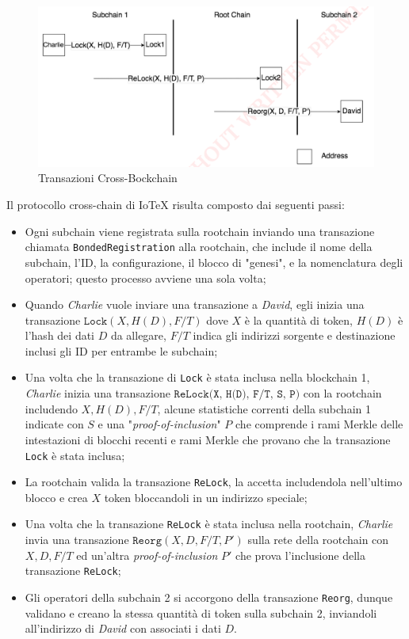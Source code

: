 \begin{figure}[ht]
	\includegraphics[width=\textwidth]{Figura2.png}
	\caption{Transazioni Cross-Bockchain}
	\label{fig:fig2}
\end{figure}

Il protocollo cross-chain di IoTeX risulta composto dai seguenti passi:

\begin{itemize}
	\item Ogni subchain viene registrata sulla rootchain inviando una transazione chiamata \texttt{BondedRegistration} alla rootchain, che include il nome della subchain, l'ID, la configurazione, il blocco di "genesi", e la nomenclatura degli operatori; questo processo avviene una sola volta;

	\item Quando \emph{Charlie} vuole inviare una transazione a \emph{David}, egli inizia una transazione $\texttt{Lock}(X, H(D), F/T)$ dove $X$ è la quantità di token, $H(D)$ è l'hash dei dati $D$ da allegare, $F/T$ indica gli indirizzi sorgente e destinazione inclusi gli ID per entrambe le subchain;

	\item Una volta che la transazione di \texttt{Lock} è stata inclusa nella blockchain 1, \emph{Charlie} inizia una transazione $\texttt{ReLock(X, H(D), F/T, S, P)}$ con la rootchain includendo $X, H(D), F/T$, alcune statistiche correnti della subchain 1 indicate con $S$ e una "\emph{proof-of-inclusion}" $P$ che comprende i rami Merkle delle intestazioni di blocchi recenti e rami Merkle che provano che la transazione \texttt{Lock} è stata inclusa;

	\item La rootchain valida la transazione \texttt{ReLock}, la accetta includendola nell'ultimo blocco e crea $X$ token bloccandoli in un indirizzo speciale;

	\item Una volta che la transazione \texttt{ReLock} è stata inclusa nella rootchain, \emph{Charlie} invia una transazione $\texttt{Reorg}(X, D, F/T, P')$ sulla rete della rootchain con $X, D, F/T$ ed un'altra \emph{proof-of-inclusion} $P'$ che prova l'inclusione della transazione \texttt{ReLock};

	\item Gli operatori della subchain 2 si accorgono della transazione \texttt{Reorg}, dunque validano e creano la stessa quantità di token sulla subchain 2, inviandoli all'indirizzo di \emph{David} con associati i dati $D$.

\end{itemize}

